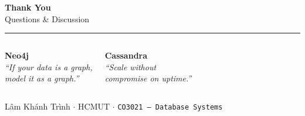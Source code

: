 \documentclass[aspectratio=169]{beamer}
\begin{document}
\begin{frame}{}
  \begin{center}
    \vspace{1.5cm}
    {\Huge \textbf{Thank You}}\\[0.5cm]
    {\large Questions \& Discussion}\\[1.0cm]
    \hrule
    \vspace{0.5cm}
    \begin{columns}[c]
        \begin{tcolorbox}
          \centering\small
          \textbf{Neo4j}\\
          \textit{``If your data is a graph,\\model it as a graph.''}
        \end{tcolorbox}
        \begin{tcolorbox}[cassbox]
          \centering\small
          \textbf{Cassandra}\\
          \textit{``Scale without\\compromise on uptime.''}
        \end{tcolorbox}
    \end{columns}
    \vspace{0.5cm}
    {\small L\^{a}m Kh\'{a}nh Tr\`{i}nh $\cdot$ HCMUT $\cdot$ \texttt{CO3021 — Database Systems}}
  \end{center}
\end{frame}
\end{document}
